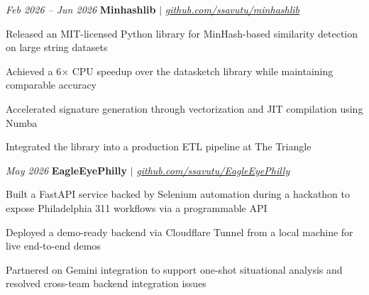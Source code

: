 \vspace{0.11 cm}
\begin{twocolentry}{
        \textit{Feb 2026 – Jun 2026}}
    \textbf{Minhashlib} \textnormal{$|$} \textit{\href{https://github.com/ssavutu/minhashlib}{github.com/ssavutu/minhashlib}}
\end{twocolentry}

\vspace{0.09 cm}
\begin{onecolentry}
    \begin{highlights}
        \item Released an MIT-licensed Python library for MinHash-based similarity detection on large string datasets
        \item Achieved a 6× CPU speedup over the datasketch library while maintaining comparable accuracy
        \item Accelerated signature generation through vectorization and JIT compilation using Numba
        \item Integrated the library into a production ETL pipeline at The Triangle
    \end{highlights}
\end{onecolentry}

\vspace{0.11 cm}
\begin{twocolentry}{
        \textit{May 2026}}
    \textbf{EagleEyePhilly} \textnormal{$|$} \textit{\href{https://github.com/ssavutu/EagleEyePhilly}{github.com/ssavutu/EagleEyePhilly}}
\end{twocolentry}

\vspace{0.09 cm}
\begin{onecolentry}
    \begin{highlights}
        \item Built a FastAPI service backed by Selenium automation during a hackathon to expose Philadelphia 311 workflows via a programmable API
        \item Deployed a demo-ready backend via Cloudflare Tunnel from a local machine for live end-to-end demos
        \item Partnered on Gemini integration to support one-shot situational analysis and resolved cross-team backend integration issues
    \end{highlights}
\end{onecolentry}
